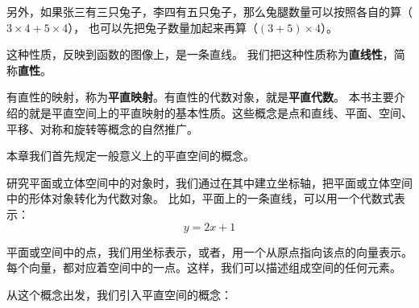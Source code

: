 \documentclass[12pt,UTF8]{ctexbook}
\begin{document}
另外，如果张三有三只兔子，李四有五只兔子，那么兔腿数量可以按照各自的算（$3\times4 +5\times4$），
也可以先把兔子数量加起来再算（$(3+5)\times4$）。

这种性质，反映到函数的图像上，是一条直线。
我们把这种性质称为\textbf{直线性}，简称\textbf{直性}。

有直性的映射，称为\textbf{平直映射}。有直性的代数对象，就是\textbf{平直代数}。
本书主要介绍的就是平直空间上的平直映射的基本性质。这些概念是点和直线、平面、空间、平移、对称和旋转等概念的自然推广。

本章我们首先规定一般意义上的平直空间的概念。

研究平面或立体空间中的对象时，我们通过在其中建立坐标轴，把平面或立体空间中的形体对象转化为代数对象。
比如，平面上的一条直线，可以用一个代数式表示：
$$ y = 2x + 1$$

平面或空间中的点，我们用坐标表示，或者，用一个从原点指向该点的向量表示。
每个向量，都对应着空间中的一点。这样，我们可以描述组成空间的任何元素。

从这个概念出发，我们引入平直空间的概念：
\end{document}
